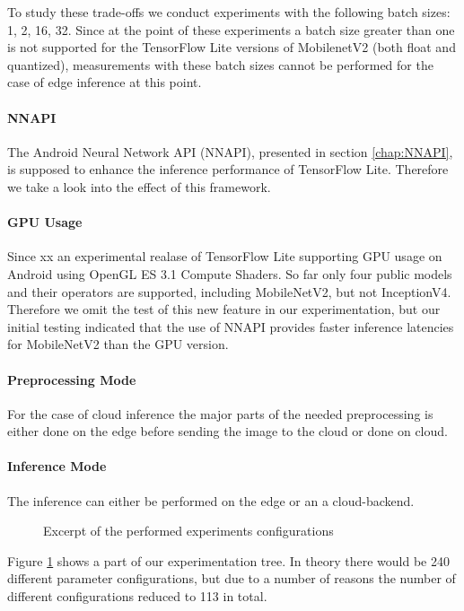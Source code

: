 To study these trade-offs we conduct experiments with the following batch sizes: 1, 2, 16, 32. Since at the point of these experiments a batch size greater than one is not supported for the TensorFlow Lite versions of MobilenetV2 (both float and quantized), measurements with these batch sizes cannot be performed for the case of edge inference at this point.
\paragraph{NNAPI}
The Android Neural Network API (NNAPI), presented in section \ref{chap:NNAPI}, is supposed to enhance the inference performance of TensorFlow Lite. Therefore we take a look into the effect of this framework.
\paragraph{GPU Usage}
Since xx an experimental realase of TensorFlow Lite supporting GPU usage on Android using OpenGL ES 3.1 Compute Shaders.
So far only four public models and their operators are supported, including MobileNetV2, but not InceptionV4. 
Therefore we omit the test of this new feature in our experimentation, but our initial testing indicated that the use of NNAPI provides faster inference latencies for MobileNetV2 than the GPU version.
\paragraph{Preprocessing Mode}
For the case of cloud inference the major parts of the needed preprocessing is either done on the edge before sending the image to the cloud or done on cloud.
\paragraph{Inference Mode}
The inference can either be performed on the edge or an a cloud-backend.


\begin{figure}[H]
\centering
 \scalebox{.7}{}

\caption{Excerpt of the performed experiments configurations}
\label{fig:tree}
\end{figure}
Figure \ref{fig:tree} shows a part of our experimentation tree. In theory there would be 240 different parameter configurations, but due to a number of reasons the number of different configurations reduced to 113 in total.

